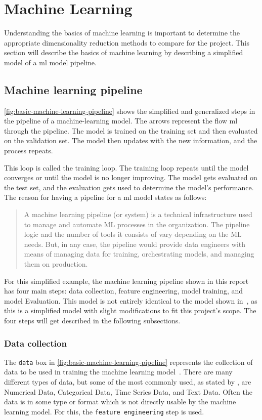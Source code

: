 \section{Machine Learning}\label{sec:theory-machine-learning}
Understanding the basics of machine learning is important to determine the appropriate dimensionality reduction methods to compare for the project. This section will describe the basics of machine learning by describing a simplified model of a \gls{ml} model pipeline.

\subsection{Machine learning pipeline}\label{subsec:machine-learning-pipeline}
\autoref{fig:basic-machine-learning-pipeline} shows the simplified and generalized steps in the pipeline of a machine-learning model. The arrows represent the flow \gls{ml} through the pipeline. The model is trained on the training set and then evaluated on the validation set. The model then updates with the new information, and the process repeats.

This loop is called the training loop. The training loop repeats until the model converges or until the model is no longer improving. The model gets evaluated on the test set, and the evaluation gets used to determine the model's performance. The reason for having a pipeline for a \gls{ml} model states as follows:

\blockcquote{machine-learning-pipeline-architecture}{A machine learning pipeline (or system) is a technical infrastructure used to manage and automate ML processes in the organization. The pipeline logic and the number of tools it consists of vary depending on the ML needs. But, in any case, the pipeline would provide data engineers with means of managing data for training, orchestrating models, and managing them on production.}

For this simplified example, the machine learning pipeline shown in this report has four main steps: data collection, feature engineering, model training, and model Evaluation. This model is not entirely identical to the model shown in~\cite{machine-learning-pipeline-architecture}, as this is a simplified model with slight modifications to fit this project's scope. The four steps will get described in the following subsections.


\subsubsection{Data collection}\label{subsubsec:machine-learning-pipeline-data-collection}
The \texttt{data} box in \autoref{fig:basic-machine-learning-pipeline} represents the collection of data to be used in training the machine learning model~\cite{machine-learning-pipeline-architecture}. There are many different types of data, but some of the most commonly used, as stated by \cite{the-importance-of-machine-learning-data}, are Numerical Data, Categorical Data, Time Series Data, and Text Data. Often the data is in some type or format which is not directly usable by the machine learning model. For this, the \texttt{feature engineering} step is used.

